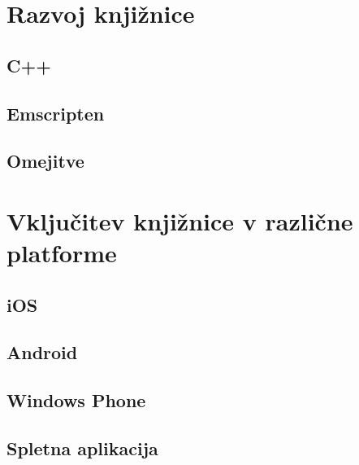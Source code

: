 \chapter{Razvoj knjižnice}
\label{chap:development}

\section{C++}

\section{Emscripten}

\section{Omejitve}

\chapter{Vključitev knjižnice v različne platforme}
\label{chap:cross-platform}

\section{iOS}

\section{Android}

\section{Windows Phone}

\section{Spletna aplikacija}
